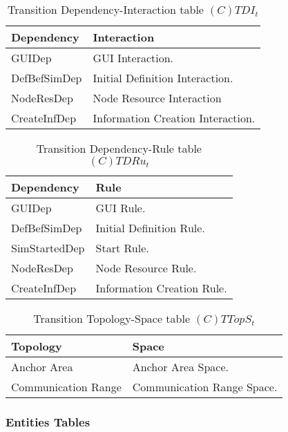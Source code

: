 \begin{table}[H]
	\centering
	\begin{tabular}{|p{4cm}|p{8cm}|}
			\hline
			\textbf{Dependency} & \textbf{Interaction} \\
			\hline
			GUIDep & GUI Interaction. \\
			\hline
			DefBefSimDep & Initial Definition Interaction. \\
			\hline
			NodeResDep & Node Resource Interaction \\
			\hline
			CreateInfDep & Information Creation Interaction. \\
			\hline
		\end{tabular}
	\caption{Transition Dependency-Interaction table $(C)TDI_t$}
	\label{tab:ctdit}
\end{table}

\begin{table}[H]
	\centering
	\begin{tabular}{|p{4cm}|p{8cm}|}
			\hline
			\textbf{Dependency} & \textbf{Rule} \\
			\hline
			GUIDep & GUI Rule. \\
			\hline
			DefBefSimDep & Initial Definition Rule. \\
			\hline
			SimStartedDep & Start Rule. \\
			\hline
			NodeResDep & Node Resource Rule. \\
			\hline
			CreateInfDep & Information Creation Rule. \\
			\hline
		\end{tabular}
	\caption{Transition Dependency-Rule table $(C)TDRu_t$}
	\label{tab:ctdrut}
\end{table}

\begin{table}[H]
	\centering
	\begin{tabular}{|p{4cm}|p{8cm}|}
			\hline
			\textbf{Topology} & \textbf{Space} \\
			\hline
			Anchor Area & Anchor Area Space.\\
			\hline
			Communication Range & Communication Range Space. \\
			\hline
		\end{tabular}
	\caption{Transition Topology-Space table $(C)TTopS_t$}
	\label{tab:cttopst}
\end{table}

\subsubsection{Entities Tables}

